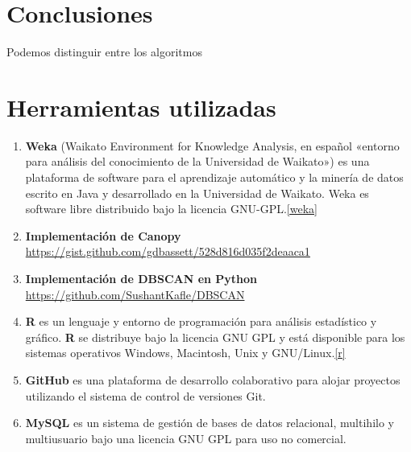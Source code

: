 \documentclass[a4paper, 12pt]{article}
\begin{document}

\pagebreak
\section{Conclusiones}

Podemos distinguir entre los algoritmos 

\pagebreak
\section{Herramientas utilizadas}

\begin{enumerate}
	\item \textbf{Weka} (Waikato Environment for Knowledge Analysis, en espa\~nol «entorno para an\'alisis del conocimiento de la Universidad de Waikato») es una plataforma de software para el aprendizaje autom\'atico y la miner\'ia de datos escrito en Java y desarrollado en la Universidad de Waikato. Weka es software libre distribuido bajo la licencia GNU-GPL.\ref{weka}
	
	\item \textbf{Implementaci\'on de Canopy} \\ \url{https://gist.github.com/gdbassett/528d816d035f2deaaca1}

	\item \textbf{Implementaci\'on de DBSCAN en Python} \\ \url{https://github.com/SushantKafle/DBSCAN}
	
	\item \textbf{R} es un lenguaje y entorno de programación para análisis estadístico y gráfico. \textbf{R} se distribuye bajo la licencia GNU GPL y está disponible para los sistemas operativos Windows, Macintosh, Unix y GNU/Linux.\ref{r}
	
	\item \textbf{GitHub} es una plataforma de desarrollo colaborativo para alojar proyectos utilizando el sistema de control de versiones Git.
	
	\item \textbf{MySQL} es un sistema de gestión de bases de datos relacional, multihilo y multiusuario bajo una licencia GNU GPL para uso no comercial.
	
\end{enumerate}
\end{document}
